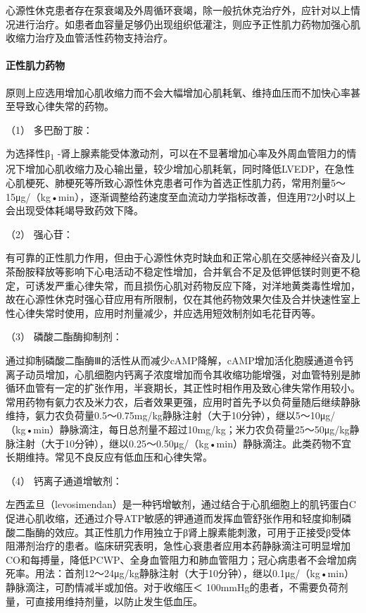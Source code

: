 心源性休克患者存在泵衰竭及外周循环衰竭，除一般抗休克治疗外，应针对以上情况进行治疗。如患者血容量足够仍出现组织低灌注，则应予正性肌力药物加强心肌收缩力治疗及血管活性药物支持治疗。

\paragraph{正性肌力药物}

原则上应选用增加心肌收缩力而不会大幅增加心肌耗氧、维持血压而不加快心率甚至导致心律失常的药物。

\hypertarget{text00059.htmlux5cux23CHP2-3-3-2-1-1}{}
（1） 多巴酚丁胺：

为选择性β\textsubscript{1}
-肾上腺素能受体激动剂，可以在不显著增加心率及外周血管阻力的情况下增加心肌收缩力及心输出量，较少增加心肌耗氧，同时降低LVEDP，在急性心肌梗死、肺梗死等所致心源性休克患者可作为首选正性肌力药，常用剂量5～15μg/（kg•min），逐渐调整给药速度至血流动力学指标改善，但连用72小时以上会出现受体耗竭导致药效下降。

\hypertarget{text00059.htmlux5cux23CHP2-3-3-2-1-2}{}
（2） 强心苷：

有可靠的正性肌力作用，但由于心源性休克时缺血和正常心肌在交感神经兴奋及儿茶酚胺释放等影响下心电活动不稳定性增加，合并氧合不足及低钾低镁时则更不稳定，可诱发严重心律失常，而且损伤心肌对药物反应下降，对洋地黄类毒性增加，故在心源性休克时强心苷应用有所限制，仅在其他药物效果欠佳及合并快速性室上性心律失常时使用，应用时剂量减少，并应选用短效制剂如毛花苷丙等。

\hypertarget{text00059.htmlux5cux23CHP2-3-3-2-1-3}{}
（3） 磷酸二酯酶抑制剂：

通过抑制磷酸二酯酶Ⅲ的活性从而减少cAMP降解，cAMP增加活化胞膜通道令钙离子动员增加，心肌细胞内钙离子浓度增加而令其收缩功能增强，对血管特别是肺循环血管有一定的扩张作用，半衰期长，其正性时相作用及致心律失常作用较小。常用药物有氨力农及米力农，后者效果更强，应用时首先予以负荷量随后继续静脉维持，氨力农负荷量0.5～0.75mg/kg静脉注射（大于10分钟），继以5～10μg/（kg•min）静脉滴注，每日总剂量不超过10mg/kg；米力农负荷量25～50μg/kg静脉注射（大于10分钟），继以0.25～0.50μg/（kg•min）静脉滴注。此类药物不宜长期维持。常见不良反应有低血压和心律失常。

\hypertarget{text00059.htmlux5cux23CHP2-3-3-2-1-4}{}
（4） 钙离子通道增敏剂：

左西孟旦（levosimendan）是一种钙增敏剂，通过结合于心肌细胞上的肌钙蛋白C促进心肌收缩，还通过介导ATP敏感的钾通道而发挥血管舒张作用和轻度抑制磷酸二酯酶的效应。其正性肌力作用独立于β肾上腺素能刺激，可用于正接受β受体阻滞剂治疗的患者。临床研究表明，急性心衰患者应用本药静脉滴注可明显增加CO和每搏量，降低PCWP、全身血管阻力和肺血管阻力；冠心病患者不会增加病死率。用法：首剂12～24μg/kg静脉注射（大于10分钟），继以0.1μg/（kg•min）静脉滴注，可酌情减半或加倍。对于收缩压＜
100mmHg的患者，不需要负荷剂量，可直接用维持剂量，以防止发生低血压。

